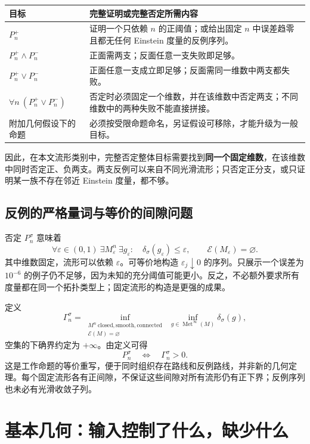 \documentclass[11pt,a4paper]{article}
\theoremstyle{definition}
\newcommand{\Met}{\operatorname{Met}}
\newcommand{\Ein}{\mathcal E}
\begin{document}
\begin{longtable}{P{0.31\textwidth}P{0.62\textwidth}}
\toprule
目标 & 完整证明或完整否定所需内容\\\midrule
$P_n^+$ & 证明一个只依赖 $n$ 的正阈值；或给出固定 $n$ 中误差趋零且都无任何 Einstein 度量的反例序列。\\
$P_n^+\wedge P_n^-$ & 正面需两支；反面任意一支失败即足够。\\
$P_n^+\vee P_n^-$ & 正面任意一支成立即足够；反面需同一维数中两支都失败。\\
$\forall n\ (P_n^+\vee P_n^-)$ & 否定时必须固定一个维数，并在该维数中否定两支；不同维数中的两种失败不能直接拼接。\\
附加几何假设下的命题 & 必须按受限命题命名，另证假设可移除，才能升级为一般目标。\\\bottomrule
\end{longtable}

因此，在本文流形类别中，完整否定整体目标需要找到\textbf{同一个固定维数}，在该维数中同时否定正、负两支。两支反例可以来自不同光滑流形；只否定正分支，或只证明某一族不存在邻近 Einstein 度量，都不够。

\subsection{反例的严格量词与等价的间隙问题}

否定 $P_n^\sigma$ 意味着
\begin{equation}\label{eq:neg}
\forall\varepsilon\in(0,1)\ \exists M_\varepsilon^n\ \exists g_\varepsilon:\quad
\delta_\sigma(g_\varepsilon)\le\varepsilon,\qquad
\Ein(M_\varepsilon)=\varnothing.
\end{equation}
其中维数固定，流形可以依赖 $\varepsilon$。可等价地构造 $\varepsilon_j\downarrow0$ 的序列。只展示一个误差为 $10^{-6}$ 的例子仍不足够，因为未知的充分阈值可能更小。反之，不必额外要求所有度量都在同一个拓扑类型上；固定流形的构造是更强的成果。

定义
\[
\Gamma_n^\sigma=
\inf_{\substack{M^n\ \mathrm{closed,smooth,connected}\\\Ein(M)=\varnothing}}
\ \inf_{g\in\Met^\infty(M)}\delta_\sigma(g),
\]
空集的下确界约定为 $+\infty$。由定义可得
\[
P_n^\sigma\quad\Longleftrightarrow\quad\Gamma_n^\sigma>0.
\]
这是工作命题的等价重写，便于同时组织存在路线和反例路线，并非新的几何定理。每个固定流形各有正间隙，不保证这些间隙对所有流形仍有正下界；反例序列也未必有光滑收敛子列。

\section{基本几何：输入控制了什么，缺少什么}
\end{document}
